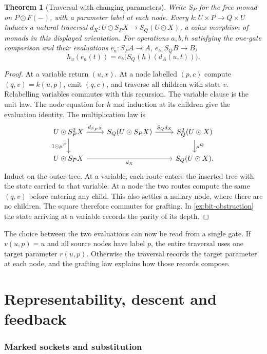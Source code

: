\documentclass[11pt,a4paper]{article}
\newtheorem{theorem}{Theorem}[section]
\theoremstyle{definition}
\theoremstyle{remark}\newaliascnt{remark}{theorem}
\numberwithin{equation}{section}
\begin{document}
\begin{theorem}[Traversal with changing parameters]\label{thm:traversal}
Write $S_P$ for the free monad on $P\odot F(-)$, with a parameter label at each node. Every $k:U\times P\to Q\times U$ induces a natural traversal $d_X:U\odot S_P X\to S_Q(U\odot X)$, a colax morphism of monads in this displayed orientation. For operations $a,b,h$ satisfying the one-gate comparison and their evaluations $e_a:S_P A\to A$, $e_b:S_Q B\to B$,
\[
 h_u(e_a(t))=e_b\big(S_Q(h)(d_A(u,t))\big).
\]
\end{theorem}
\begin{proof}
At a variable return $(u,x)$. At a node labelled $(p,c)$ compute $(q,v)=k(u,p)$, emit $(q,c)$, and traverse all children with state $v$. Relabelling variables commutes with this recursion. The variable clause is the unit law. The node equation for $h$ and induction at its children give the evaluation identity. The multiplication law is
\[
\begin{tikzcd}[column sep=normal]
 U\odot S_P^2X \arrow[r,"d_{S_PX}"]\arrow[d,"{1\odot\mu^P}"']&
 S_Q(U\odot S_PX) \arrow[r,"S_Q d_X"]&S_Q^2(U\odot X)\arrow[d,"\mu^Q"]\\
 U\odot S_PX \arrow[rr,"d_X"']&&S_Q(U\odot X).
\end{tikzcd}
\]
Induct on the outer tree. At a variable, each route enters the inserted tree with the state carried to that variable. At a node the two routes compute the same $(q,v)$ before entering any child. This also settles a nullary node, where there are no children. The square therefore commutes for grafting. In \cref{ex:bit-obstruction} the state arriving at a variable records the parity of its depth.
\end{proof}

The choice between the two evaluations can now be read from a single gate. If $v(u,p)=u$ and all source nodes have label $p$, the entire traversal uses one target parameter $r(u,p)$. Otherwise the traversal records the target parameter at each node, and the grafting law explains how those records compose.

\clearpage
\part{Representability, descent and feedback}\label{part:feedback}

\section{Marked sockets and substitution}\label{sec:variation}
\end{document}
